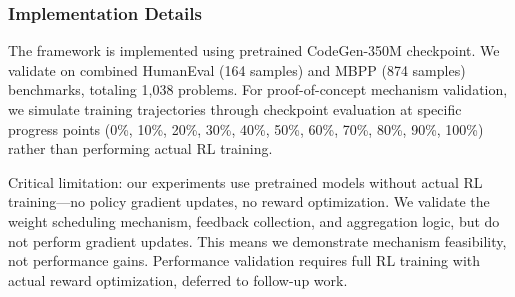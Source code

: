 \subsubsection{Implementation Details}

The framework is implemented using pretrained CodeGen-350M checkpoint. We validate on combined HumanEval (164 samples) and MBPP (874 samples) benchmarks, totaling 1,038 problems. For proof-of-concept mechanism validation, we simulate training trajectories through checkpoint evaluation at specific progress points (0\%, 10\%, 20\%, 30\%, 40\%, 50\%, 60\%, 70\%, 80\%, 90\%, 100\%) rather than performing actual RL training.

Critical limitation: our experiments use pretrained models without actual RL training---no policy gradient updates, no reward optimization. We validate the weight scheduling mechanism, feedback collection, and aggregation logic, but do not perform gradient updates. This means we demonstrate mechanism feasibility, not performance gains. Performance validation requires full RL training with actual reward optimization, deferred to follow-up work.

